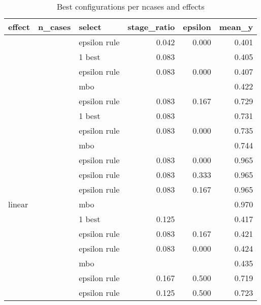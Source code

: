 \begin{table}

\caption{Best configurations per ncases and effects}
\centering
\fontsize{6}{8}\selectfont
\begin{tabular}[t]{lrlrrr}
\toprule
effect & n\_cases & select & stage\_ratio & epsilon & mean\_y\\
\midrule
 &  & epsilon rule & 0.042 & 0.000 & 0.401\\

 &  & 1 best & 0.083 &  & 0.405\\

 &  & epsilon rule & 0.083 & 0.000 & 0.407\\

 & \multirow{-4}{*}{\raggedleft\arraybackslash 500} & mbo &  &  & 0.422\\
\cmidrule{2-6}
 &  & epsilon rule & 0.083 & 0.167 & 0.729\\

 &  & 1 best & 0.083 &  & 0.731\\

 &  & epsilon rule & 0.083 & 0.000 & 0.735\\

 & \multirow{-4}{*}{\raggedleft\arraybackslash 1000} & mbo &  &  & 0.744\\
\cmidrule{2-6}
 &  & epsilon rule & 0.083 & 0.000 & 0.965\\

 &  & epsilon rule & 0.083 & 0.333 & 0.965\\

 &  & epsilon rule & 0.083 & 0.167 & 0.965\\

\multirow{-12}{*}{\raggedright\arraybackslash linear} & \multirow{-4}{*}{\raggedleft\arraybackslash 2000} & mbo &  &  & 0.970\\
\cmidrule{1-6}
 &  & 1 best & 0.125 &  & 0.417\\

 &  & epsilon rule & 0.083 & 0.167 & 0.421\\

 &  & epsilon rule & 0.083 & 0.000 & 0.424\\

 & \multirow{-4}{*}{\raggedleft\arraybackslash 500} & mbo &  &  & 0.435\\
\cmidrule{2-6}
 &  & epsilon rule & 0.167 & 0.500 & 0.719\\

 &  & epsilon rule & 0.125 & 0.500 & 0.723\\


\end{tabular}
\end{table}
